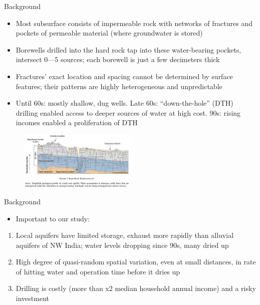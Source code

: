 \documentclass[10pt]{beamer}
\begin{document}
\begin{frame}
	{Background}
	\begin{itemize}
		\item Most subsurface consists of impermeable rock with networks of fractures and pockets of permeable material (where groundwater is stored)
		\item Borewells drilled into the hard rock tap into these water-bearing pockets, intersect 0—5 sources; each borewell is just a few decimeters thick
		\item Fractures' exact location and spacing cannot be determined by surface features; their patterns are highly heterogeneous and unpredictable
		\item Until 60s: mostly shallow, dug wells. Late 60s: “down-the-hole” (DTH) drilling enabled access to deeper sources of water at high cost. 90s: rising incomes enabled a proliferation of DTH
	\end{itemize}
	\begin{figure}
		\centering
		\includegraphics[width=0.5\textwidth]{figure2.png}
	\end{figure}
\end{frame}

\begin{frame}
	{Background}
	\begin{itemize}
		\item Important to our study:

	\end{itemize}
	\begin{enumerate}
		\item Local aquifers have limited storage, exhaust more rapidly than alluvial aquifers of NW India; water levels dropping since 90s, many dried up
		\item High degree of quasi-random spatial variation, even at small distances, in rate of hitting water and operation time before it dries up
		\item Drilling is costly (more than x2 median household annual income) and a risky investment
	\end{enumerate}
\end{frame}
\end{document}
